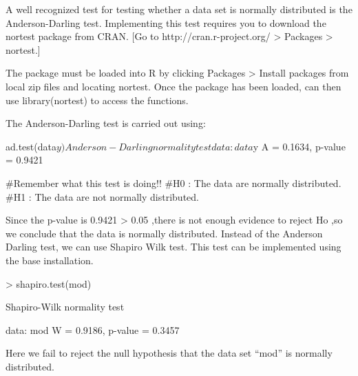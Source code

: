 A well recognized test for testing whether a data set is normally distributed is the Anderson-Darling test. Implementing this test requires you to download the nortest package from CRAN. [Go to http://cran.r-project.org/ > Packages > nortest.]

The package must be loaded into R by clicking Packages > Install packages from local zip files and locating nortest. Once the package has been loaded, can then use library(nortest) to access the functions.

The Anderson-Darling test is carried out using:

ad.test(data$y)
Anderson-Darling normality test
data: data$y
A = 0.1634, p-value = 0.9421

#Remember what this test is doing!!
#H0 : The data are normally distributed.
#H1 : The data are not normally distributed.

Since the p-value is 0.9421 > 0.05 ,there is not enough evidence to reject Ho ,so we conclude that the data is normally distributed.
Instead of the Anderson Darling test, we can use Shapiro Wilk test. This test can be implemented using the base installation. 


> shapiro.test(mod)

        Shapiro-Wilk normality test

data:  mod 
W = 0.9186, p-value = 0.3457

Here we fail to reject the null hypothesis that the data set “mod” is normally distributed.

